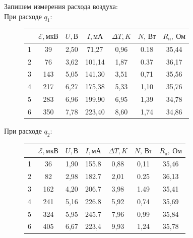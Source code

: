 \documentclass[a4paper,12pt]{article}
\begin{document}
\begin{enumerate}
		
	\end{enumerate}

        Запишем измерения расхода воздуха:\\

        При расходе $q_1$:
        \begin{figure}[H]
        \center
        \begin{tabular}{|c|c|c|c|c|c|c|}\hline
        {} &   $\mathcal{E}, \text{мкВ}$ & $U, \text{В}$ & $I, \text{мА}$ & $\Delta T, K$ & $N,\, \text{Вт}$ & $R_\text{н},\ \text{Ом}$ \\\hline
        1 &  39  &  2,50 &  71,27  &   0,96 &  0.18 &  35,44 \\\hline
        2 &  76  &  3,62 &  101,14 &   1,87 &  0.37 &  36,17 \\\hline
        3 &  143 &  5,05 &  141,30 &  3,51  &  0,71 &  35,56 \\\hline
        4 &  217 &  6,27 &  175,38 &  5,33 &  1,10 &  35,76\\\hline
        5 &  283 &  6,96 &  199,90 &  6,95 &  1,39 &  34,78 \\\hline
        6 &  350 &  7,78 &  223,40 &  8,60 &  1,74 &  34,86 \\\hline
        \end{tabular}
        \end{figure}

        При расходе $q_2$:
        \begin{figure}[H]
        \center
        \begin{tabular}{|c|c|c|c|c|c|c|}\hline
        {} &   $\mathcal{E}, \text{мкВ}$ & $U, \text{В}$ & $I, \text{мА}$ & $\Delta T, K$ & $N,\, \text{Вт}$ & $R_\text{н},\ \text{Ом}$ \\\hline
        1 &  36  &  1,90 &  155.8 &  0,88 &  0,11 &  35,46 \\\hline
        2 &  82  &  2,98 &  182.7 &  2,01 &  0.25 &  36,13 \\\hline
        3 &  162 &  4,20 &  206.7 &  3,98 &  1.49 &  35,41 \\\hline
        4 &  241 &  5,16 &  226.8 &  5,92 &  0,74 &  35,69 \\\hline
        5 &  324 &  5,95 &  245.7 &  7,96 &  0,99 &  35,84 \\\hline
        6 &  405 &  6,67 &  223,4 &  9,93 &  1,24 &  35,78 \\\hline
        \end{tabular}
        \end{figure}
\end{document}
